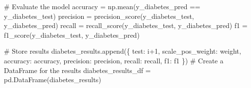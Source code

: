 \documentclass[
  letterpaper,
  DIV=11,
  numbers=noendperiod]{scrreprt}
\newenvironment{Shaded}{\begin{snugshade}}{\end{snugshade}}
\newcommand{\CommentTok}[1]{\textcolor[rgb]{0.37,0.37,0.37}{#1}}
\newcommand{\DecValTok}[1]{\textcolor[rgb]{0.68,0.00,0.00}{#1}}
\newcommand{\NormalTok}[1]{\textcolor[rgb]{0.00,0.23,0.31}{#1}}
\newcommand{\OperatorTok}[1]{\textcolor[rgb]{0.37,0.37,0.37}{#1}}
\newcommand{\StringTok}[1]{\textcolor[rgb]{0.13,0.47,0.30}{#1}}
\begin{document}
\begin{Shaded}
\begin{Highlighting}[]
    \CommentTok{\# Evaluate the model}
\NormalTok{    accuracy }\OperatorTok{=}\NormalTok{ np.mean(y\_diabetes\_pred }\OperatorTok{==}\NormalTok{ y\_diabetes\_test)}
\NormalTok{    precision }\OperatorTok{=}\NormalTok{ precision\_score(y\_diabetes\_test, y\_diabetes\_pred)}
\NormalTok{    recall }\OperatorTok{=}\NormalTok{ recall\_score(y\_diabetes\_test, y\_diabetes\_pred)}
\NormalTok{    f1 }\OperatorTok{=}\NormalTok{ f1\_score(y\_diabetes\_test, y\_diabetes\_pred)}
    
    \CommentTok{\# Store results}
\NormalTok{    diabetes\_results.append(\{}
        \StringTok{\textquotesingle{}test\textquotesingle{}}\NormalTok{: i}\OperatorTok{+}\DecValTok{1}\NormalTok{,}
        \StringTok{\textquotesingle{}scale\_pos\_weight\textquotesingle{}}\NormalTok{: weight,}
        \StringTok{\textquotesingle{}accuracy\textquotesingle{}}\NormalTok{: accuracy,}
        \StringTok{\textquotesingle{}precision\textquotesingle{}}\NormalTok{: precision,}
        \StringTok{\textquotesingle{}recall\textquotesingle{}}\NormalTok{: recall,}
        \StringTok{\textquotesingle{}f1\textquotesingle{}}\NormalTok{: f1}
\NormalTok{    \})}
\CommentTok{\# Create a DataFrame for the results}
\NormalTok{diabetes\_results\_df }\OperatorTok{=}\NormalTok{ pd.DataFrame(diabetes\_results)   }


\end{Highlighting}
\end{Shaded}
\end{document}
